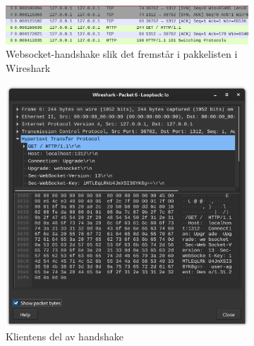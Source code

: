 \documentclass{article}
\begin{document}
\begin{figure}[h]
    \centering
    \begin{subfigure}{\linewidth}
        \centering
        \includegraphics*[width=\linewidth]{illustrasjoner/WS_handshake.png}
        \caption{Websocket-handshake slik det fremstår i pakkelisten i Wireshark}
    \end{subfigure}

    \begin{subfigure}{.48\linewidth}
        \centering
        \includegraphics*[width=\linewidth]{illustrasjoner/WS_handshake_klient.png}
        \caption{Klientens del av handshake}
    \end{subfigure}
    \hfill
    \begin{subfigure}{.48\linewidth}
        \centering

\end{subfigure}
\end{figure}
\end{document}
